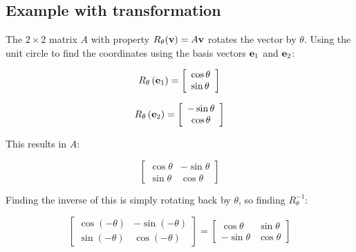 \subsection{Example with transformation}

The $2\times 2$ matrix $A$ with property $R_\theta(\textbf{v})=A\textbf{v}$ rotates the vector by $\theta$.
Using the unit circle to find the coordinates using the basis vectors $\textbf{e}_1$ and $\textbf{e}_2$:

\[
    R_{\theta}\left(\textbf{e}_{1}\right)=\left[\begin{array}{l}
    \cos \theta \\
    \sin \theta
    \end{array}\right]
\]

\[
    R_{\theta}\left(\textbf{e}_{2}\right)=\left[\begin{array}{c}
    -\sin \theta \\
    \cos \theta
    \end{array}\right]
\]

This results in $A$:

\[
    \left[\begin{array}{cc}
    \cos \theta & -\sin \theta \\
    \sin \theta & \cos \theta
    \end{array}\right]
\]

Finding the inverse of this is simply rotating back by $\theta$, so finding $R^{-1}_{\theta}$:

\[
    \left[\begin{array}{cc}
    \cos (-\theta) & -\sin (-\theta) \\
    \sin (-\theta) & \cos (-\theta)
    \end{array}\right]
    =
    \left[\begin{array}{cc}
    \cos \theta & \sin \theta \\
    -\sin \theta & \cos \theta
    \end{array}\right]
\]